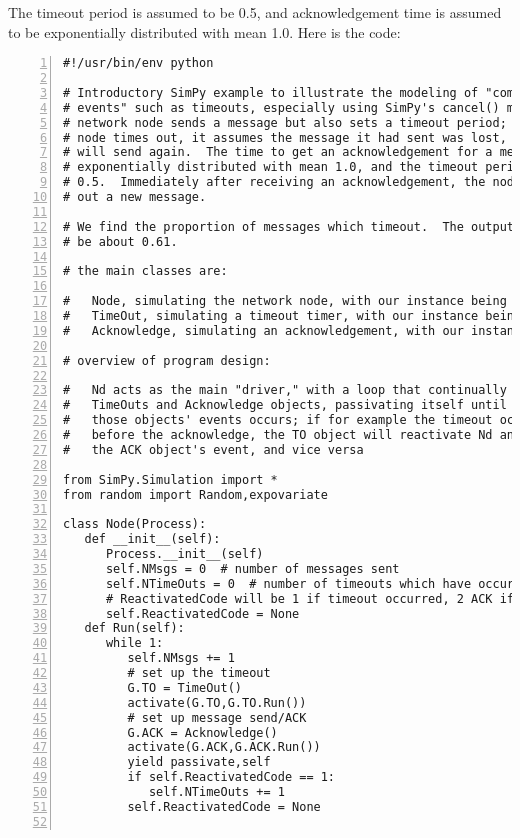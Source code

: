 \documentclass[11pt]{article}
\begin{document}
The timeout period is assumed to be 0.5, and acknowledgement time is
assumed to be exponentially distributed with mean 1.0.  Here is the
code:

\begin{Verbatim}[fontsize=\relsize{-2},numbers=left]
#!/usr/bin/env python

# Introductory SimPy example to illustrate the modeling of "competing
# events" such as timeouts, especially using SimPy's cancel() method.  A
# network node sends a message but also sets a timeout period; if the
# node times out, it assumes the message it had sent was lost, and it
# will send again.  The time to get an acknowledgement for a message is
# exponentially distributed with mean 1.0, and the timeout period is
# 0.5.  Immediately after receiving an acknowledgement, the node sends
# out a new message.

# We find the proportion of messages which timeout.  The output should
# be about 0.61.

# the main classes are:

#   Node, simulating the network node, with our instance being Nd
#   TimeOut, simulating a timeout timer, with our instance being TO
#   Acknowledge, simulating an acknowledgement, with our instance being ACK

# overview of program design:

#   Nd acts as the main "driver," with a loop that continually creates 
#   TimeOuts and Acknowledge objects, passivating itself until one of
#   those objects' events occurs; if for example the timeout occurs
#   before the acknowledge, the TO object will reactivate Nd and cancel
#   the ACK object's event, and vice versa

from SimPy.Simulation import *
from random import Random,expovariate

class Node(Process):
   def __init__(self):
      Process.__init__(self)  
      self.NMsgs = 0  # number of messages sent
      self.NTimeOuts = 0  # number of timeouts which have occurred
      # ReactivatedCode will be 1 if timeout occurred, 2 ACK if received  
      self.ReactivatedCode = None  
   def Run(self):
      while 1:
         self.NMsgs += 1
         # set up the timeout
         G.TO = TimeOut()
         activate(G.TO,G.TO.Run())
         # set up message send/ACK
         G.ACK = Acknowledge()
         activate(G.ACK,G.ACK.Run())
         yield passivate,self 
         if self.ReactivatedCode == 1:
            self.NTimeOuts += 1
         self.ReactivatedCode = None


\end{Verbatim}
\end{document}
